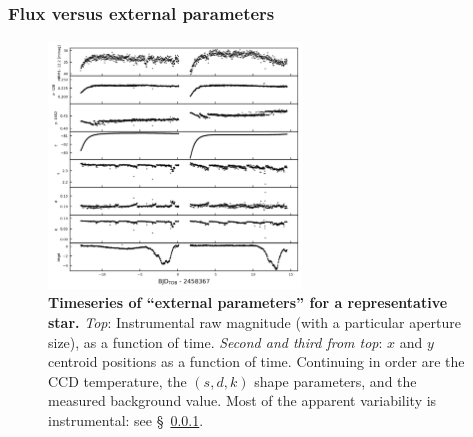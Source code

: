 \documentclass[12pt,twocolumn,tighten]{aastex62}
\begin{document}
\subsubsection{Flux versus external parameters}
\label{sec:flux_vs_external_parameters}

\begin{figure}[t]
	\begin{center}
		\leavevmode
		\includegraphics[width=0.6\textwidth]{epdparams_vs_time.png}
	\end{center}
	\vspace{-0.5cm}
	\caption{
    {\bf Timeseries of ``external parameters'' for a representative
    star.} {\it Top}: Instrumental raw magnitude (with a particular
    aperture size), as a function of time.  {\it Second and third from
    top}: $x$ and $y$ centroid positions as a function of time.
    Continuing in order are the CCD temperature, the $(s,d,k)$ shape
    parameters, and the measured background value.
    Most of the apparent variability is instrumental: see
    \S~\ref{sec:flux_vs_external_parameters}.
		\label{fig:external_parameter_timeseries}
	}
\end{figure}


\end{document}
